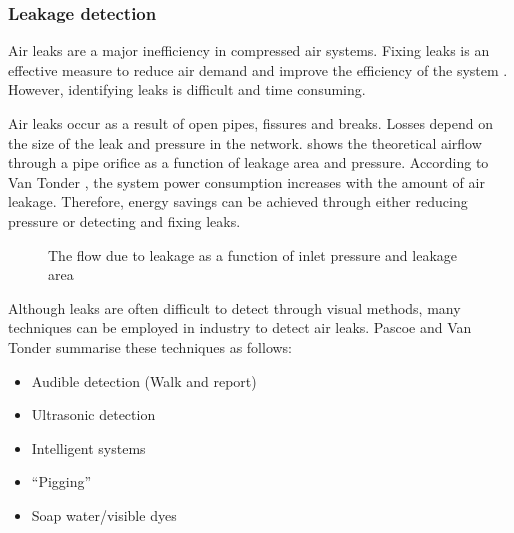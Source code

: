 		 \subsubsection{Leakage detection}	 
		 Air leaks are a major inefficiency in compressed air systems. Fixing leaks is an effective measure to reduce air demand and improve the efficiency of the system \cite{van2011sustaining}. However, identifying leaks is difficult and time consuming.
		 \par 
		  Air leaks occur as a result of open pipes, fissures and breaks. Losses depend on the size of the leak and pressure in the network.  shows the theoretical airflow through a pipe orifice as a function of leakage area and pressure\footnotemark[1]. According to Van Tonder \cite{van2011sustaining}, the system power consumption increases with the amount of air leakage. Therefore, energy savings can be achieved through either reducing pressure or detecting and fixing leaks.
		 \begin{figure}[!htbp]
		 	\centering
		 	\fbox{\hspace{1.5cm}\hspace{1.5cm}}
		 	\caption[The flow due to leakage as a function of inlet pressure and leakage area]{ The flow due to leakage as a function of inlet pressure and leakage area\protect\footnotemark[1]}
		 	\label{fig: Leak losses}
		 \end{figure}
	 \par 
		 Although leaks are often difficult to detect through visual methods, many techniques can be employed in industry to detect air leaks. Pascoe \cite{Pascoe2016Masters} and Van Tonder \cite{vanTonder2010Masters} summarise these techniques as follows:
		 \begin{itemize}
		 	\item Audible detection (Walk and report)
		 	\item Ultrasonic detection
		 	\item Intelligent systems\footnotemark[2]
		 	\item \enquote{Pigging}\footnotemark[3]
		 	\item Soap water/visible dyes 
		 \end{itemize}
